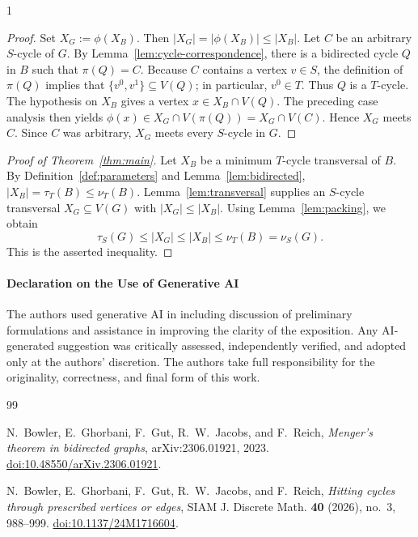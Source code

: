 \documentclass[a4paper,11pt]{article}
\theoremstyle{plain}
\theoremstyle{definition}
\theoremstyle{remark}
\begin{document}
\begin{spacing}{1}
\begin{proof}
Set $X_G:=\phi(X_B)$.  Then $|X_G|=|\phi(X_B)|\leq|X_B|$.  Let $C$ be an arbitrary
$S$-cycle of $G$.  By Lemma~\ref{lem:cycle-correspondence}, there is a
bidirected cycle $Q$ in $B$ such that $\pi(Q)=C$.  Because $C$ contains a
vertex $v\in S$, the definition of $\pi(Q)$ implies that
$\{v^0,v^1\}\subseteq V(Q)$; in particular, $v^0\in T$.  Thus $Q$ is a
$T$-cycle.  The hypothesis on $X_B$
gives a vertex $x\in X_B\cap V(Q)$.  The preceding case analysis then yields
$\phi(x)\in X_G\cap V(\pi(Q))=X_G\cap V(C)$.  Hence $X_G$ meets $C$.  Since
$C$ was arbitrary, $X_G$ meets every $S$-cycle in $G$.
\end{proof}

\begin{proof}[Proof of Theorem~\ref{thm:main}]
Let $X_B$ be a minimum $T$-cycle transversal of $B$.  By
Definition~\ref{def:parameters} and Lemma~\ref{lem:bidirected},
$|X_B|=\tau_T(B)\leq\nu_T(B)$.
Lemma~\ref{lem:transversal} supplies an $S$-cycle transversal
$X_G\subseteq V(G)$ with $|X_G|\leq|X_B|$.  Using
Lemma~\ref{lem:packing}, we obtain
\[
  \tau_S(G)\leq |X_G|\leq |X_B|
  \leq\nu_T(B)=\nu_S(G).
\]
This is the asserted inequality.
\end{proof}

\paragraph{Declaration on the Use of Generative AI}

The authors used generative AI in including discussion of preliminary formulations and assistance in improving the clarity of the exposition. Any AI-generated suggestion was critically assessed, independently verified, and adopted only at the authors' discretion. The authors take full responsibility for the originality, correctness, and final form of this work.

\begin{thebibliography}{99}

N.~Bowler, E.~Ghorbani, F.~Gut, R.~W.~Jacobs, and F.~Reich,
\emph{Menger's theorem in bidirected graphs},
arXiv:2306.01921, 2023.
\href{https://doi.org/10.48550/arXiv.2306.01921}{doi:10.48550/arXiv.2306.01921}.

N.~Bowler, E.~Ghorbani, F.~Gut, R.~W.~Jacobs, and F.~Reich,
\emph{Hitting cycles through prescribed vertices or edges},
SIAM J. Discrete Math. \textbf{40} (2026), no.~3, 988--999.
\href{https://doi.org/10.1137/24M1716604}{doi:10.1137/24M1716604}.


\end{thebibliography}
\end{spacing}
\end{document}
